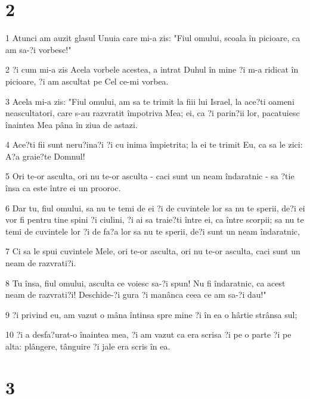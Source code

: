 \chapter{2}

\par 1 Atunci am auzit glasul Unuia care mi-a zis: "Fiul omului, scoala în picioare, ca am sa-?i vorbesc!"
\par 2 ?i cum mi-a zis Acela vorbele acestea, a intrat Duhul în mine ?i m-a ridicat în picioare, ?i am ascultat pe Cel ce-mi vorbea.
\par 3 Acela mi-a zis: "Fiul omului, am sa te trimit la fiii lui Israel, la ace?ti oameni neascultatori, care s-au razvratit împotriva Mea; ei, ca ?i parin?ii lor, pacatuiesc înaintea Mea pâna în ziua de astazi.
\par 4 Ace?ti fii sunt neru?ina?i ?i cu inima împietrita; la ei te trimit Eu, ca sa le zici: A?a graie?te Domnul!
\par 5 Ori te-or asculta, ori nu te-or asculta - caci sunt un neam îndaratnic - sa ?tie însa ca este între ei un prooroc.
\par 6 Dar tu, fiul omului, sa nu te temi de ei ?i de cuvintele lor sa nu te sperii, de?i ei vor fi pentru tine spini ?i ciulini, ?i ai sa traie?ti între ei, ca între scorpii; sa nu te temi de cuvintele lor ?i de fa?a lor sa nu te sperii, de?i sunt un neam îndaratnic,
\par 7 Ci sa le spui cuvintele Mele, ori te-or asculta, ori nu te-or asculta, caci sunt un neam de razvrati?i.
\par 8 Tu însa, fiul omului, asculta ce voiesc sa-?i spun! Nu fi îndaratnic, ca acest neam de razvrati?i! Deschide-?i gura ?i manânca ceea ce am sa-?i dau!"
\par 9 ?i privind eu, am vazut o mâna întinsa spre mine ?i în ea o hârtie strânsa sul;
\par 10 ?i a desfa?urat-o înaintea mea, ?i am vazut ca era scrisa ?i pe o parte ?i pe alta: plângere, tânguire ?i jale era scris în ea.

\chapter{3}

